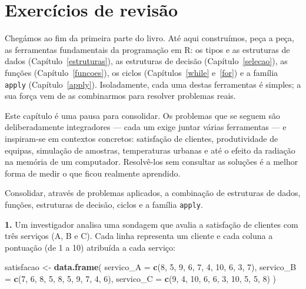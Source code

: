 \documentclass[
  portuguese,
  11pt,
  openany]{book}
\newenvironment{Shaded}{\begin{snugshade}}{\end{snugshade}}
\newcommand{\AttributeTok}[1]{\textcolor[rgb]{0.13,0.29,0.53}{#1}}
\newcommand{\DecValTok}[1]{\textcolor[rgb]{0.00,0.00,0.81}{#1}}
\newcommand{\FunctionTok}[1]{\textcolor[rgb]{0.13,0.29,0.53}{\textbf{#1}}}
\newcommand{\NormalTok}[1]{#1}
\newcommand{\OtherTok}[1]{\textcolor[rgb]{0.56,0.35,0.01}{#1}}
\begin{document}
\chapter{Exercícios de revisão}\label{revisao}

Chegámos ao fim da primeira parte do livro. Até aqui construímos, peça a peça, as
ferramentas fundamentais da programação em R: os tipos e as estruturas de dados
(Capítulo~\ref{estruturas}), as estruturas de decisão (Capítulo~\ref{selecao}),
as funções (Capítulo~\ref{funcoes}), os ciclos (Capítulos~\ref{while} e~\ref{for}) e a família \texttt{apply} (Capítulo~\ref{apply}). Isoladamente, cada uma
destas ferramentas é simples; a sua força vem de as combinarmos para resolver
problemas reais.

Este capítulo é uma pausa para consolidar. Os problemas que se seguem são deliberadamente
integradores --- cada um exige juntar várias ferramentas --- e inspiram-se em contextos
concretos: satisfação de clientes, produtividade de equipas, simulação de amostras,
temperaturas urbanas e até o efeito da radiação na memória de um computador. Resolvê-los
sem consultar as soluções é a melhor forma de medir o que ficou realmente aprendido.

Consolidar, através de problemas aplicados, a combinação de estruturas de dados,
funções, estruturas de decisão, ciclos e a família \texttt{apply}.

\textbf{1.} Um investigador analisa uma sondagem que avalia a satisfação de clientes com
três serviços (A, B e C). Cada linha representa um cliente e cada coluna a pontuação
(de 1 a 10) atribuída a cada serviço:

\begin{Shaded}
\begin{Highlighting}[]
\NormalTok{satisfacao }\OtherTok{\textless{}{-}} \FunctionTok{data.frame}\NormalTok{(}
  \AttributeTok{servico\_A =} \FunctionTok{c}\NormalTok{(}\DecValTok{8}\NormalTok{, }\DecValTok{5}\NormalTok{, }\DecValTok{9}\NormalTok{, }\DecValTok{6}\NormalTok{, }\DecValTok{7}\NormalTok{, }\DecValTok{4}\NormalTok{, }\DecValTok{10}\NormalTok{, }\DecValTok{6}\NormalTok{, }\DecValTok{3}\NormalTok{, }\DecValTok{7}\NormalTok{),}
  \AttributeTok{servico\_B =} \FunctionTok{c}\NormalTok{(}\DecValTok{7}\NormalTok{, }\DecValTok{6}\NormalTok{, }\DecValTok{8}\NormalTok{, }\DecValTok{5}\NormalTok{, }\DecValTok{8}\NormalTok{, }\DecValTok{5}\NormalTok{, }\DecValTok{9}\NormalTok{, }\DecValTok{7}\NormalTok{, }\DecValTok{4}\NormalTok{, }\DecValTok{6}\NormalTok{),}
  \AttributeTok{servico\_C =} \FunctionTok{c}\NormalTok{(}\DecValTok{9}\NormalTok{, }\DecValTok{4}\NormalTok{, }\DecValTok{10}\NormalTok{, }\DecValTok{6}\NormalTok{, }\DecValTok{6}\NormalTok{, }\DecValTok{3}\NormalTok{, }\DecValTok{10}\NormalTok{, }\DecValTok{5}\NormalTok{, }\DecValTok{5}\NormalTok{, }\DecValTok{8}\NormalTok{)}
\NormalTok{)}
\end{Highlighting}
\end{Shaded}
\end{document}
